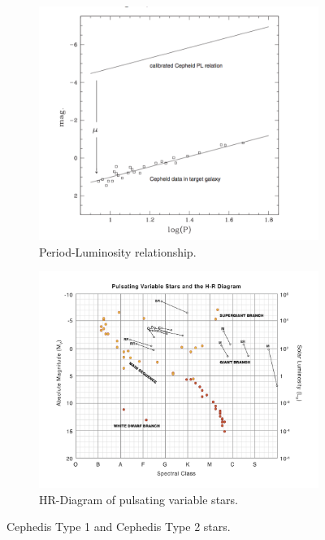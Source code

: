 \documentclass[letterpaper,11pt]{article}
\begin{document}






\begin{figure}[H]
\centering
\begin{subfigure}{.5\textwidth}
  \centering
  \includegraphics[width=.4\linewidth]{figures/Ngeow1_fig}
  \caption{Period-Luminosity relationship.}
  \label{fig:plrelationrrlyrae}
\end{subfigure}%
\begin{subfigure}{.5\textwidth}
  \centering
  \includegraphics[width=.4\linewidth]{figures/var_star_HR.png}
  \caption{HR-Diagram of pulsating variable stars.}
  \label{fig:var-star-hr}
\end{subfigure}
\caption{Cephedis Type 1 and Cephedis Type 2 stars.}
\label{fig:test}
\end{figure}
\end{document}
